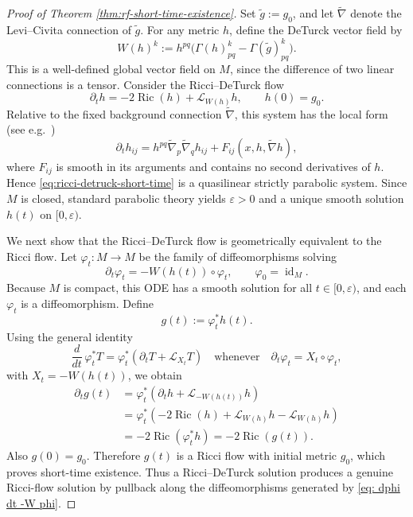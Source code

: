 \documentclass[11pt]{article}
\theoremstyle{plain}
\theoremstyle{definition}
\theoremstyle{remark}
\begin{document}
\begin{proof}[Proof of Theorem \ref{thm:rf-short-time-existence}]
Set $\tilde g:=g_0$, and let $\widetilde{\nabla}$ denote the Levi--Civita
connection of $\tilde g$.  For any metric $h$, define the DeTurck vector field by
\[
W(h)^k :=  h^{pq}\bigl(\Gamma(h)^k_{pq}-\Gamma(\tilde g)^k_{pq}\bigr).
\]
This is a well-defined global vector field on $M$, since the difference of
two linear connections is a tensor.
Consider the Ricci--DeTurck flow
\begin{equation}\label{eq:ricci-detruck-short-time}
\partial_t h = -2\operatorname{Ric}(h)+\mathcal L_{W(h)}h,
\qquad
h(0)=g_0.
\end{equation}
Relative to the fixed background connection $\widetilde{\nabla}$, this system has
the local form
(see e.g.~\cite[(2.51)]{MR2274812})
\[
\partial_t h_{ij}
=
h^{pq}\widetilde{\nabla}_p\widetilde{\nabla}_q h_{ij}
+
F_{ij}(x,h,\widetilde{\nabla}h),
\]
where $F_{ij}$ is smooth in its arguments and contains no second derivatives of
$h$. Hence \eqref{eq:ricci-detruck-short-time} is a quasilinear strictly parabolic
system. Since $M$ is closed, standard parabolic theory yields $\varepsilon>0$ and a
unique smooth solution $h(t)$ on $[0,\varepsilon)$.\smallskip 

We next show that the Ricci--DeTurck flow is geometrically equivalent to
the Ricci flow.  Let $\varphi_t:M\to M$ be the family of diffeomorphisms
solving
\begin{equation}\label{eq: dphi dt -W phi}
\partial_t\varphi_t=-W(h(t))\circ\varphi_t,
\qquad
\varphi_0=\operatorname{id}_M.
\end{equation}
Because $M$ is compact, this ODE has a smooth solution for all
$t\in[0,\varepsilon)$, and each $\varphi_t$ is a diffeomorphism. Define
\[
g(t) :=  \varphi_t^*h(t).
\]
Using the general identity
\[
\frac{d}{dt}\,\varphi_t^*T
=
\varphi_t^*\!\left(\partial_t T+\mathcal L_{X_t}T\right)
\quad\text{whenever}\quad
\partial_t\varphi_t=X_t\circ\varphi_t,
\]
with $X_t=-W(h(t))$, we obtain
\begin{align*}
\partial_t g(t)
&=
\varphi_t^*\!\left(\partial_t h+\mathcal L_{-W(h(t))}h\right) \\
&=
\varphi_t^*\!\left(-2\operatorname{Ric}(h)+\mathcal L_{W(h)}h-\mathcal L_{W(h)}h\right) \\
&=
-2\operatorname{Ric}(\varphi_t^*h)
=
-2\operatorname{Ric}(g(t)).
\end{align*}
Also $g(0)=g_0$. Therefore $g(t)$ is a Ricci flow with initial metric $g_0$, which proves
short-time existence.  Thus a Ricci--DeTurck solution produces a genuine
Ricci-flow solution by pullback along the diffeomorphisms generated by
\eqref{eq: dphi dt -W phi}.


\end{proof}
\end{document}
